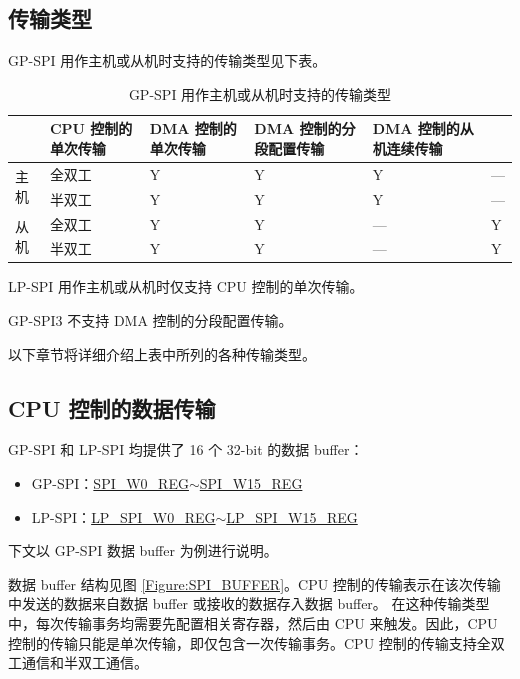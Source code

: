 \documentclass[main\_\_CN.tex]{subfiles}
\begin{document}
\subsection{传输类型}

GP-SPI 用作主机或从机时支持的传输类型见下表。

\begin{table}[H]
    \centering
    \caption{GP-SPI 用作主机或从机时支持的传输类型}
    \label{tab:transfer-modes}
    \begin{threeparttable}
    \begin{tabular}{|l|l|p{2.5cm}<{\centering}|p{2.5cm}<{\centering}|p{3.3cm}<{\centering}|p{3.3cm}<{\centering}| }
    \hline
        \rowcolor{lightgray}
        \multicolumn{2}{l|}{\textbf{模式}}  & \textbf{CPU 控制的单次传输 \tnote{1}}  & \textbf{DMA 控制的单次传输} &   \textbf{DMA 控制的分段配置传输 \tnote{2}}    & \textbf{DMA 控制的从机连续传输} \\\hline
    \multirow{2}{*}{主机} & 全双工 & Y & Y & Y & ---\\\cline{2-6}
    
    & 半双工 & Y & Y & Y & ---\\\hline
    
    \multirow{2}{*}{从机} & 全双工 & Y & Y & --- &Y \\\cline{2-6}
    & 半双工 & Y & Y & --- &Y \\\hline
        \end{tabular}
            \begin{tablenotes}
            \item[1] LP-SPI 用作主机或从机时仅支持 CPU 控制的单次传输。
            \item[2]GP-SPI3 不支持 DMA 控制的分段配置传输。
        \end{tablenotes}
     \end{threeparttable}
    \end{table}

以下章节将详细介绍上表中所列的各种传输类型。

\subsection{CPU 控制的数据传输}\label{sec:cpu-controlled-data-transfer}
\vspace{2em}
\begin{tiplisting}
GP-SPI 和 LP-SPI 均提供了 16 个 32-bit 的数据 buffer：
\begin{itemize}
    \item GP-SPI：\hyperref[regdesc:SPIW0REG]{SPI\_W0\_REG}$\sim$\hyperref[regdesc:SPIW15REG]{SPI\_W15\_REG}
    \item LP-SPI：\hyperref[regdesc:LPSPIW0REG]{LP\_SPI\_W0\_REG}$\sim$\hyperref[regdesc:LPSPIW15REG]{LP\_SPI\_W15\_REG}
\end{itemize}
下文以 GP-SPI 数据 buffer 为例进行说明。
\end{tiplisting}
数据 buffer 结构见图 \ref{Figure:SPI_BUFFER}。CPU 控制的传输表示在该次传输中发送的数据来自数据 buffer 或接收的数据存入数据 buffer。  
在这种传输类型中，每次传输事务均需要先配置相关寄存器，然后由 CPU 来触发。因此，CPU 控制的传输只能是单次传输，即仅包含一次传输事务。CPU 控制的传输支持全双工通信和半双工通信。
\end{document}
